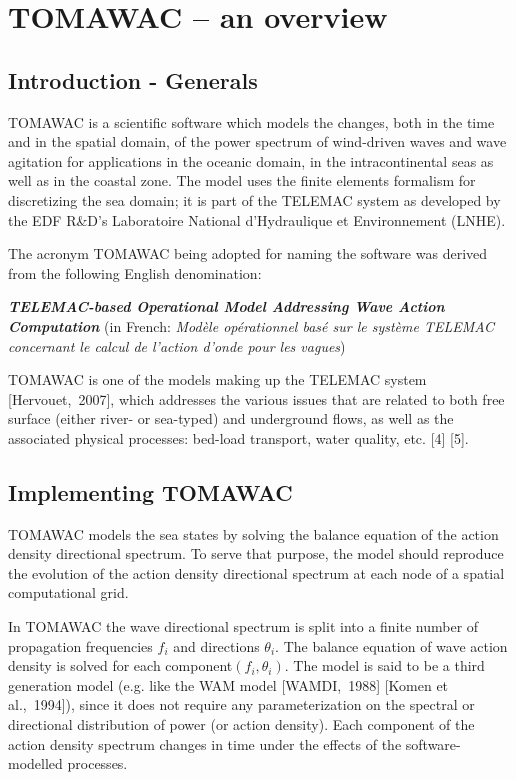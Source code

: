 
\chapter{  TOMAWAC -- an overview}


\section{ Introduction - Generals}

TOMAWAC is a scientific software which models the changes, both in the time and in the spatial domain, of the power spectrum of wind-driven waves and wave agitation for applications in the oceanic domain, in the intracontinental seas as well as in the coastal zone. The model uses the finite elements formalism for discretizing the sea domain; it is part of the TELEMAC system as developed by the EDF R\&D's Laboratoire National d'Hydraulique et Environnement (LNHE).

The acronym TOMAWAC being adopted for naming the software was derived from the following English denomination:

 \textbf{\textit{TELEMAC-based Operational Model Addressing Wave Action Computation}}
(in French: \textit{Mod\`ele op\'erationnel bas\'e sur le syst\`eme TELEMAC concernant le calcul de l'action d'onde pour les vagues})

 TOMAWAC is one of the models making up the TELEMAC system [Hervouet,~2007], which addresses the various issues that are related to both free surface (either river- or sea-typed) and underground flows, as well as the associated physical processes: bed-load transport, water quality, etc. [4] [5].


\section{ Implementing TOMAWAC }

 TOMAWAC models the sea states by solving the balance equation of the action density directional spectrum. To serve that purpose, the model should reproduce the evolution of the action density directional spectrum at each node of a spatial computational grid.

 In TOMAWAC the wave directional spectrum is split into a finite number of propagation frequencies $f_{i}$ and directions $\theta_{i}$. The balance equation of wave action density is solved for each component$\left(f_{i} ,\theta _{i} \right)$. The model is said to be a third generation model (e.g. like the WAM model [WAMDI,~1988] [Komen et al.,~1994]), since it does not require any parameterization on the spectral or directional distribution of power (or action density). Each component of the action density spectrum changes in time under the effects of the software-modelled processes.


